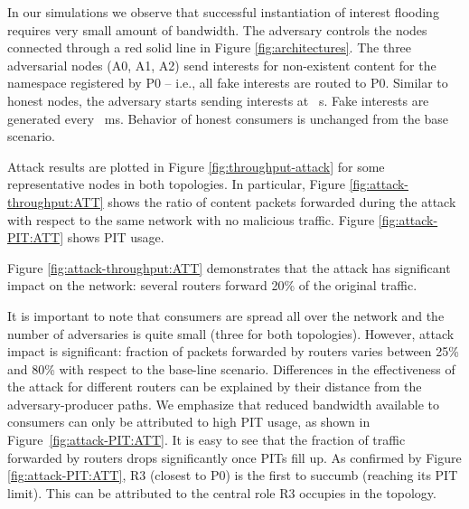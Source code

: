 \documentclass[10pt,conference,letterpaper]{IEEEtran}
\begin{document}
In our simulations we observe that successful instantiation of interest flooding requires very small 
amount of  bandwidth.
The adversary controls the nodes connected through a red solid line in Figure 
\ref{fig:architectures}.
The three adversarial nodes (A0, A1, A2) send interests for non-existent content for the 
namespace registered by P0 -- i.e., all fake interests are routed to P0. Similar to 
honest nodes, the adversary starts sending interests at ~s. Fake interests are 
generated every ~ms. Behavior of honest consumers is unchanged from the base scenario.

Attack results are plotted in Figure \ref{fig:throughput-attack} for some representative 
nodes in both topologies. In particular, 
Figure \ref{fig:attack-throughput:ATT} shows the ratio of content packets forwarded during 
the attack with respect to the same network with no malicious traffic. 
Figure \ref{fig:attack-PIT:ATT} shows PIT usage.



\begin{figure*}[htp!]
 \centering
{}
\hspace{-3mm}
 \caption{Interest Flooding Attack (IFA): impact over baseline}
\label{fig:throughput-attack}
 \end{figure*}





Figure \ref{fig:attack-throughput:ATT} demonstrates that the attack has significant impact on the network:  
several routers forward 20\% of the original traffic. 




It is important to note that 
consumers are spread all 
over the network and the number of adversaries is quite small (three for both topologies). However, 
attack impact is significant: fraction of packets forwarded by routers varies between 25\% and 80\% 
with respect to the base-line scenario. Differences in the effectiveness of the attack for different routers  
can be explained by their distance from the adversary-producer paths.
We emphasize that reduced bandwidth available to consumers can only be attributed 
to high PIT usage, as shown in 
Figure~\ref{fig:attack-PIT:ATT}.
It is easy to see that the fraction of traffic forwarded by routers drops significantly 
once PITs fill up.
As confirmed by Figure \ref{fig:attack-PIT:ATT}, R3 (closest to P0) is the first to succumb (reaching its PIT limit). This can be attributed to the central role R3 occupies in the topology.
\end{document}
